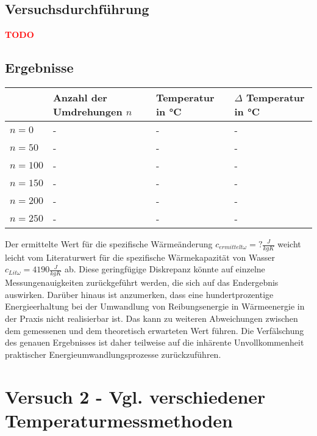 	    \subsection{Versuchsdurchführung}
		\textbf{\textcolor{red}{TODO}}
	
  
    \subsection{Ergebnisse}

        \begin{table}[H]
            \centering
            \begin{tabular}{|l|l|l|l|}
                \hline
                & Anzahl der Umdrehungen $n$ & Temperatur in °C & $\Delta$ Temperatur in °C\\
                \hline
                $n = 0$ & - & -& -\\
                \hline
                $n = 50$ & - & - & -\\
                \hline
                $n = 100$ & - & - & -\\
                \hline
                $n = 150$ & - & - & -\\
                \hline
                $n = 200$ & - & - & -\\
                \hline
                $n = 250$ & - & - & -\\
                \hline
            \end{tabular}
        \end{table}

Der ermittelte Wert für die spezifische Wärmeänderung $c_{ermittelt\omega} = ? \frac{J}{kgK}$ weicht leicht vom Literaturwert für die spezifische Wärmekapazität von Wasser $c_{Lit\omega} = 4190 \frac{J}{kgK}$ ab. Diese geringfügige Diskrepanz könnte auf einzelne Messungenauigkeiten zurückgeführt werden, die sich auf das Endergebnis auswirken.
Darüber hinaus ist anzumerken, dass eine hundertprozentige Energieerhaltung bei der Umwandlung von Reibungsenergie in Wärmeenergie in der Praxis nicht realisierbar ist. Das kann zu weiteren Abweichungen zwischen dem gemessenen und dem theoretisch erwarteten Wert führen. Die Verfälschung des genauen Ergebnisses ist daher teilweise auf die inhärente Unvollkommenheit praktischer Energieumwandlungsprozesse zurückzuführen. 


\section{Versuch 2 - Vgl. verschiedener Temperaturmessmethoden}
